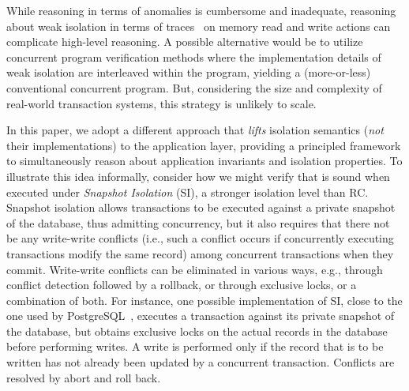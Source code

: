 While reasoning in terms of anomalies is cumbersome and inadequate,
reasoning about weak isolation in terms of
traces~\cite{adyaphd,gotsmanconcur15} on memory read and write actions
can complicate high-level reasoning.  A possible alternative would be
to utilize concurrent program verification methods where the
implementation details of weak isolation are interleaved within the
program, yielding a (more-or-less) conventional concurrent program.
But, considering the size and complexity of real-world transaction
systems, this strategy is unlikely to scale.

In this paper, we adopt a different approach that \emph{lifts}
isolation semantics (\emph{not} their implementations) to the
application layer, providing a principled framework to simultaneously
reason about application invariants and isolation properties.  To
illustrate this idea informally, consider how we might verify that
 is sound when executed under \emph{Snapshot Isolation}
(SI), a stronger isolation level than RC. Snapshot isolation allows
transactions to be executed against a private snapshot of the
database, thus admitting concurrency, but it also requires that there
not be any write-write conflicts (i.e., such a conflict occurs if
concurrently executing transactions modify the same record) among
concurrent transactions when they commit. Write-write conflicts can be
eliminated in various ways, e.g., through conflict detection followed
by a rollback, or through exclusive locks, or a combination of both.
For instance, one possible implementation of SI, close to the one used
by PostgreSQL~\cite{postgresiso}, executes a transaction against its
private snapshot of the database, but obtains exclusive locks on the
actual records in the database before performing writes. A write is
performed only if the record that is to be written has not already
been updated by a concurrent transaction. Conflicts are resolved by
abort and roll back.



